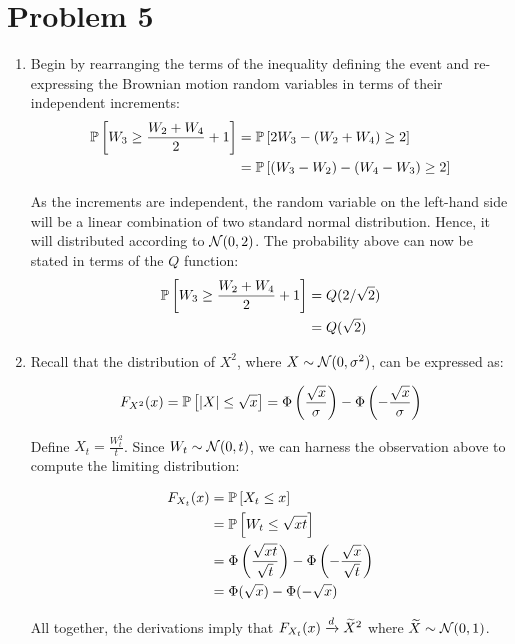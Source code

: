 \documentclass[12pt]{article}%
\begin{document}
\section{Problem 5}
\begin{enumerate}
  \item Begin by rearranging the terms of the inequality defining the event and re-expressing the Brownian motion random variables in terms of their independent increments:
  \begin{align*}
\mathbb{P}\left[W_3 \geq \frac{W_2 + W_4}{2} + 1\right] & = \mathbb{P}\left[2W_3 - (W_2 + W_4) \geq 2\right] \\
& = \mathbb{P}\left[(W_3 - W_2) - (W_4 - W_3) \geq 2\right]
  \end{align*}

  As the increments are independent, the random variable on the left-hand side will be a linear combination of two standard normal distribution. Hence, it will distributed according to $\mathcal{N}(0,2)$. The probability above can now be stated in terms of the $Q$ function:
  \begin{align*}
    \mathbb{P}\left[W_3 \geq \frac{W_2 + W_4}{2} + 1\right] & = Q(2/\sqrt{2}) \\
    & = Q(\sqrt{2})
  \end{align*}

  \item Recall that the distribution of $X^2$, where $X \sim \mathcal{N}(0,\sigma^2)$, can be expressed as:

  \[F_{X^2}(x) = \mathbb{P}\left[\abs{X} \leq \sqrt{x}\right] = \Phi\left(\frac{\sqrt{x}}{\sigma}\right) - \Phi\left(-\frac{\sqrt{x}}{\sigma}\right) \]

  Define $X_t = \frac{W_t^2}{t}$. Since $W_t \sim \mathcal{N}(0,t)$, we can harness the observation above to compute the limiting distribution:

  \begin{align*}
    F_{X_t}(x) & = \mathbb{P}\left[X_t \leq x\right] \\
      & = \mathbb{P}\left[W_t \leq \sqrt{xt}\right] \\
      & = \Phi\left(\frac{\sqrt{xt}}{\sqrt{t}}\right) - \Phi\left(-\frac{\sqrt{x}}{\sqrt{t}}\right)  \\
      & = \Phi(\sqrt{x}) - \Phi(-\sqrt{x}) \\
  \end{align*}

  All together, the derivations imply that $F_{X_t}(x) \xrightarrow[]{d} \widetilde{X}^2$ where $\widetilde{X} \sim \mathcal{N}(0,1)$.

\end{enumerate}
\end{document}
